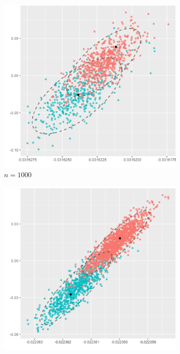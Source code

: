 \documentclass[10pt,journal,compsoc]{IEEEtran}
\numberwithin{equation}{section}
\begin{document}
\begin{figure}
\centering
\begin{subfigure}{.32\columnwidth}
\includegraphics[width=\columnwidth]{CLT_1_1.png}%
\caption{$n = 1000$}
\label{dense:1}
\end{subfigure}
\begin{subfigure}{.32\columnwidth}
\includegraphics[width=\columnwidth]{CLT_1_3.png}%

\end{subfigure}
\end{figure}
\end{document}
